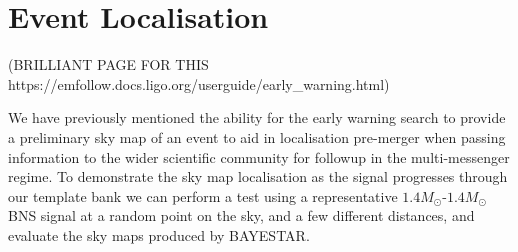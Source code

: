 \section{Event Localisation}

(BRILLIANT PAGE FOR THIS https://emfollow.docs.ligo.org/userguide/early\_warning.html)

We have previously mentioned the ability for the early warning search to provide a preliminary sky map of an event to aid in localisation pre-merger when passing information to the wider scientific community for followup in the multi-messenger regime. To demonstrate the sky map localisation as the signal progresses through our template bank we can perform a test using a representative $1.4M_\odot$-$1.4M_\odot$ BNS signal at a random point on the sky, and a few different distances, and evaluate the sky maps produced by BAYESTAR.

